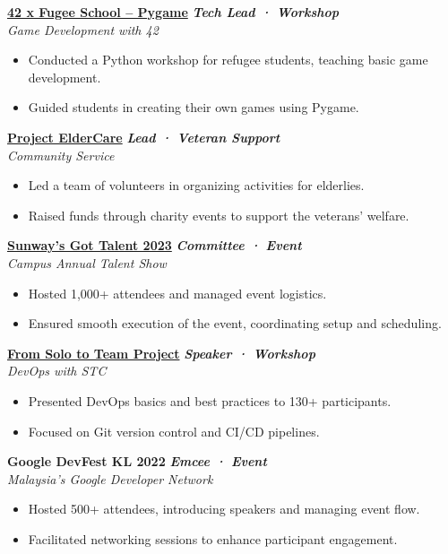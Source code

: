 \documentclass[letterpaper,10pt]{article}
\newcommand{\heading}[2]{
  \hspace{4pt}#1\hfill#2\\
}
\newcommand{\headingBf}[2]{
  \heading{\textbf{#1}}{
    \textbf{\textit{\small{#2}}}
  }
}
\newenvironment{bulletList}{
  \begin{itemize}[itemsep=1pt, parsep=1pt, leftmargin=26pt]
}{
  \end{itemize}
}
\newcommand{\oneFrag}[4]{
  \headingBf{#1}{#2}
  \hspace{6pt}\textit{#3}
  \vspace{-4pt}
  #4
}
\begin{document}
\vspace{2pt}
\oneFrag{
  \href{https://www.linkedin.com/feed/update/urn:li:activity:7219932643142901760}{42 x Fugee School -- Pygame}
}{
  Tech Lead · Workshop
}{
  Game Development with 42
}{
  \begin{bulletList}
    \item Conducted a Python workshop for refugee students, teaching basic game development.
    \item Guided students in creating their own games using Pygame.
  \end{bulletList}
}

\vspace{2pt}
\oneFrag{
  \href{https://linktr.ee/project.eldercare}{Project ElderCare}
}{
  Lead · Veteran Support
}{
  Community Service
}{
  \begin{bulletList}
    \item Led a team of volunteers in organizing activities for elderlies.
    \item Raised funds through charity events to support the veterans' welfare.
  \end{bulletList}
}

\vspace{2pt}
\oneFrag{
  \href{https://www.linkedin.com/feed/update/urn:li:activity:7092021655891316736}{Sunway's Got Talent 2023}
}{
  Committee · Event
}{
  Campus Annual Talent Show
}{
  \begin{bulletList}
    \item Hosted 1,000+ attendees and managed event logistics.
    \item Ensured smooth execution of the event, coordinating setup and scheduling.
  \end{bulletList}
}

\vspace{2pt}
\oneFrag{
  \href{https://www.linkedin.com/feed/update/urn:li:activity:7146880139035852800}{From Solo to Team Project}
}{
  Speaker · Workshop
}{
  DevOps with STC
}{
  \begin{bulletList}
    \item Presented DevOps basics and best practices to 130+ participants.
    \item Focused on Git version control and CI/CD pipelines.
  \end{bulletList}
}

\vspace{2pt}
\oneFrag{
  Google DevFest KL 2022
}{
  Emcee · Event
}{
  Malaysia's Google Developer Network
}{
  \begin{bulletList}
    \item Hosted 500+ attendees, introducing speakers and managing event flow.
    \item Facilitated networking sessions to enhance participant engagement.
  \end{bulletList}
}
\end{document}

